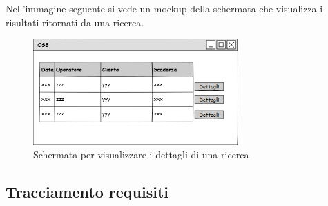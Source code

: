 Nell'immagine seguente si vede un mockup della schermata che visualizza i risultati ritornati da una ricerca.

\begin{figure}[H]
\centering
\includegraphics[width=0.7\textwidth]{images/mockup_vista_bonifico.png}
\caption{Schermata per visualizzare i dettagli di una ricerca}
\end{figure}


\subsection{Tracciamento requisiti}\label{tracciamento}

